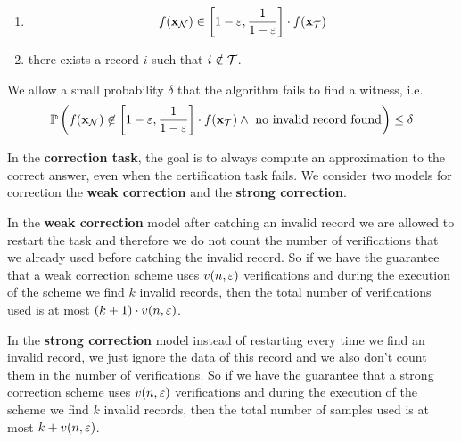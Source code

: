 \begin{enumerate}[label=(H\arabic*)]
    \item \[ f(\mathbf{x}_{\mathcal{N}}) \in \left[1 - \varepsilon, \frac{1}{1 - \varepsilon} \right] \cdot f(\mathbf{x}_{\mathcal{T}}) \] \label{eq:verH0}
    \item there exists a record $i$ such that $i \notin {\cal T}$. \label{eq:verH1}
\end{enumerate}

\noindent We allow a small probability $\delta$ that the algorithm fails to find a witness, i.e.
\[ \mathbb{P}\left( f(\mathbf{x}_{\mathcal{N}}) \not\in \left[1-\varepsilon, \frac 1 {1-\varepsilon} \right] \cdot f(\mathbf{x}_{\mathcal{T}}) \wedge \text{ no invalid record found} \right) \le \delta \]

\smallskip
\noindent In the {\bf correction task},  %
the goal is to always compute an approximation to the correct answer, even when the certification task fails.  
We consider two models for correction the {\bf weak correction} and the {\bf strong correction}.

\smallskip
\noindent In the {\bf weak correction} model after catching an invalid record we are allowed to restart the task and
therefore we do not count the number of verifications that we already used before catching the invalid record. So if we have 
the guarantee that a weak correction scheme uses $v(n , \varepsilon)$ verifications and during the execution of the scheme we find
$k$ invalid records, then the total number of verifications used is at most $(k + 1) \cdot v(n, \varepsilon)$.

\smallskip
\noindent In the {\bf strong correction} model instead of restarting every time we find an invalid record, we just ignore 
the data of this record and we also don't count them in the number of verifications. So if we have the
guarantee that a strong correction scheme uses $v(n , \varepsilon)$ verifications and during the execution of the scheme we find $k$
invalid records, then the total number of samples used is at most $k + v(n, \varepsilon)$.
